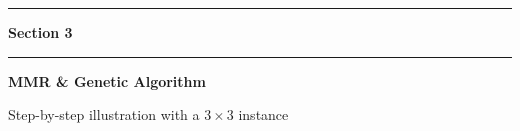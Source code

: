 \documentclass[aspectratio=169,10pt]{beamer}
\begin{document}
{
\begin{frame}[plain]

  \begin{center}
    {\color{goldaccent}\rule{0.15\textwidth}{2pt}}
    \hspace{0.5em}
    {\color{white}\large\textbf{Section 3}}
    \hspace{0.5em}
    {\color{goldaccent}\rule{0.15\textwidth}{2pt}}

    \vspace{0.6cm}
    {\color{white}\Huge\textbf{MMR \& Genetic Algorithm}}

    \vspace{0.4cm}
    {\color{iceblue}\normalsize Step-by-step illustration with a $3\times3$ instance}
  \end{center}
\end{frame}
}
\end{document}
